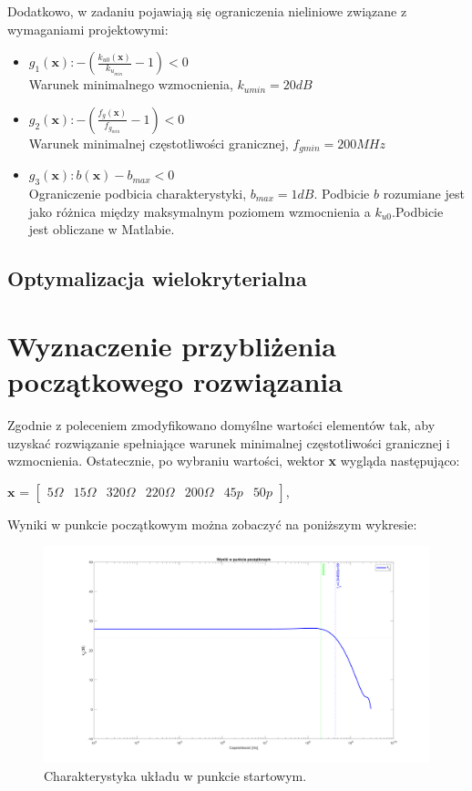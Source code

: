 \documentclass{article}
\begin{document}
Dodatkowo, w zadaniu pojawiają się ograniczenia nieliniowe związane z wymaganiami projektowymi:\\
\begin{itemize}
	\item \(g_1(\textbf{x}): -(\frac{k_{u0}(\textbf{x})}{k_{u_{min}}}-1) <  0\) \\ Warunek minimalnego wzmocnienia, $k_{umin}=20dB$
	\item \(g_2(\textbf{x}): -(\frac{{f_g}(\textbf{x})}{f_{g_{min}}}-1)<0\) \\ Warunek minimalnej częstotliwości granicznej, $f_{gmin}=200 MHz$
	\item \(g_3(\textbf{x}): b(\textbf{x})-b_{max}<0\) \\ Ograniczenie podbicia charakterystyki, $b_{max}=1dB$. Podbicie $b$ rozumiane jest jako różnica między maksymalnym poziomem wzmocnienia a $k_{u0}$.Podbicie jest obliczane w Matlabie.

\end{itemize}
\subsection{Optymalizacja wielokryterialna}



\section{Wyznaczenie przybliżenia początkowego rozwiązania}
Zgodnie z poleceniem zmodyfikowano domyślne wartości elementów tak, aby uzyskać rozwiązanie spełniające warunek minimalnej częstotliwości granicznej i wzmocnienia.
Ostatecznie, po wybraniu wartości, wektor \textbf{x} wygląda następująco:
\begin{center}
	$\textbf{x}$ =
	$\begin{bmatrix}
			5\Omega & 15\Omega & 320\Omega & 220\Omega & 200\Omega & 45p & 50p
		\end{bmatrix}$,
\end{center}

Wyniki w punkcie początkowym można zobaczyć na poniższym wykresie:

\begin{figure}[h]
	\includegraphics[width=12cm]{graphics/starting_point.png}
	\centering
	\caption{Charakterystyka układu w punkcie startowym.}
\end{figure}
\end{document}
